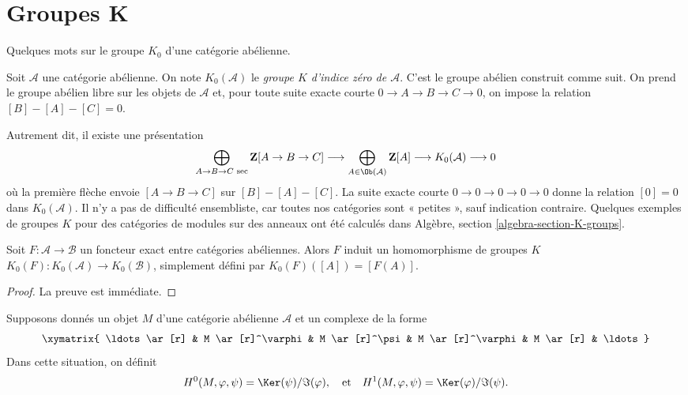 \section{Groupes K}
\label{section-K-groups}

\noindent
Quelques mots sur le groupe $K_0$ d'une catégorie abélienne.

\begin{definition}
\label{definition-K-zero}
Soit $\mathcal{A}$ une catégorie abélienne.
On note $K_0(\mathcal{A})$ le
{\it groupe $K$ d'indice zéro de $\mathcal{A}$}.
C'est le groupe abélien construit comme suit.
On prend le groupe abélien libre
sur les objets de $\mathcal{A}$
et, pour toute suite exacte courte
$0 \to A \to B \to C \to 0$,
on impose la relation $[B] - [A] - [C] = 0$.
\end{definition}

\noindent
Autrement dit, il existe une présentation
$$
\bigoplus_{A \to B \to C\text{ sec}}
\mathbf{Z}[A \to B \to C]
\longrightarrow
\bigoplus_{A \in \Ob(\mathcal{A})}
\mathbf{Z}[A]
\longrightarrow
K_0(\mathcal{A})
\longrightarrow
0
$$
où la première flèche envoie $[A \to B \to C]$ sur $[B] - [A] - [C]$.
La suite exacte courte $0 \to 0 \to 0 \to 0 \to 0$
donne la relation $[0] = 0$ dans $K_0(\mathcal{A})$.
Il n'y a pas de difficulté ensembliste, car toutes nos catégories
sont « petites », sauf indication contraire.
Quelques exemples de groupes $K$ pour des catégories de modules
sur des anneaux ont été calculés dans
Algèbre, section \ref{algebra-section-K-groups}.

\begin{lemma}
\label{lemma-exact-functor-K-groups}
Soit $F : \mathcal{A} \to \mathcal{B}$ un foncteur exact entre
catégories abéliennes. Alors $F$ induit un homomorphisme de groupes $K$
$K_0(F) : K_0(\mathcal{A}) \to K_0(\mathcal{B})$, simplement défini par
$K_0(F)([A]) = [F(A)]$.
\end{lemma}

\begin{proof}
La preuve est immédiate.
\end{proof}

\noindent
Supposons donnés un objet $M$ d'une catégorie abélienne $\mathcal{A}$
et un complexe de la forme
\begin{equation}
\label{equation-cyclic-complex}
\xymatrix{
\ldots \ar[r] &
M \ar[r]^\varphi &
M \ar[r]^\psi &
M \ar[r]^\varphi &
M \ar[r] & \ldots
}
\end{equation}
Dans cette situation, on définit
$$
H^0(M, \varphi, \psi) = \Ker(\psi)/\Im(\varphi)
, \quad\text{et}\quad
H^1(M, \varphi, \psi) = \Ker(\varphi)/\Im(\psi).
$$

